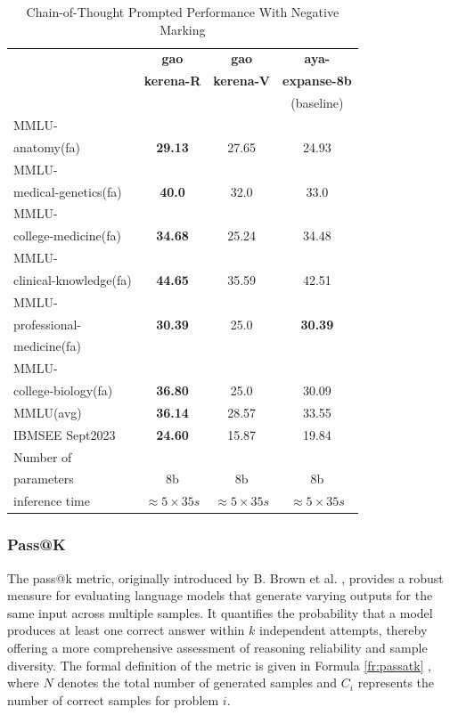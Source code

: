 \documentclass[conference]{IEEEtran}
\begin{document}
	\begin{table}[ht]
		\centering
		\caption{Chain-of-Thought Prompted Performance With Negative Marking}
		\begin{tabular}{|l|c|c|c|}  
			\hline
			\textbf{} & \textbf{gao} & \textbf{gao} & \textbf{aya-} \\ 
			& \textbf{kerena-R} &  \textbf{kerena-V} & \textbf{expanse-8b} \\
			&   & &(baseline)  \\ \hline
			MMLU- &  &  &  \\ 
			anatomy(fa)  & \textbf{29.13} & 27.65  & 24.93  \\ \hline
			MMLU- &    &  &  \\
			medical-genetics(fa) & \textbf{40.0}  & 32.0  & 33.0  \\ \hline
			MMLU- &  &    &  \\
			college-medicine(fa) & \textbf{34.68}  & 25.24  & 34.48  \\ \hline
			MMLU- &    &  &  \\
			clinical-knowledge(fa)& \textbf{44.65} & 35.59  & 42.51  \\ \hline
			MMLU- &  &  &  \\
			professional-& \textbf{30.39} & 25.0 & \textbf{30.39}   \\
                        medicine(fa)& &  &  \\ \hline
			MMLU- &  &  &  \\
			college-biology(fa)& \textbf{36.80} & 25.0  & 30.09  \\ \hline
			MMLU(avg) & \textbf{36.14} & 28.57  & 33.55  \\ \hline
			IBMSEE Sept2023 & \textbf{24.60}  & 15.87 & 19.84   \\ \hline
			Number of&  &  &  \\
			parameters & 8b & 8b & 8b \\ \hline
			inference time & $\approx 5 \times 35s$ & $\approx 5 \times 35s$ & $\approx 5 \times 35s$ \\  \hline
		\end{tabular}
		\label{tab:med_reasoning_capabillities_NM_comparison}
	\end{table}
           
           \subsubsection{Pass@K}
The pass@k metric, originally introduced by B. Brown et al.
\cite{b26}, 
provides a robust measure for evaluating language models that generate varying outputs for the same input across multiple samples. It quantifies the probability that a model produces at least one correct answer within \(k\) independent attempts, thereby offering a more comprehensive assessment of reasoning reliability and sample diversity. The formal definition of the metric is given in Formula
\ref{fr:passatk}
, where \(N\) denotes the total number of generated samples and \(C_i\) represents the number of correct samples for problem \(i\).
\end{document}
